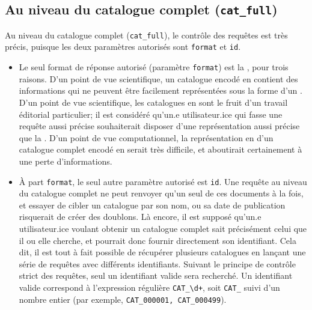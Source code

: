 \subsection{Au niveau du catalogue complet (\texttt{cat\_full})}
Au niveau du catalogue complet (\texttt{cat\_full}), le contrôle des requêtes est très précis, puisque les deux paramètres autorisés sont \texttt{format} et \texttt{id}.
\begin{itemize}
	\item Le seul format de réponse autorisé (paramètre \texttt{format}) est la \tei{}, pour trois raisons. D'un point de vue scientifique, un catalogue encodé en \tei{} contient des informations qui ne peuvent être facilement représentées sous la forme d'un \json{}. D'un point de vue scientifique, les catalogues en \tei{} sont le fruit d'un travail éditorial particulier; il est considéré qu'un.e utilisateur.ice qui fasse une requête aussi précise souhaiterait disposer d'une représentation aussi précise que la \tei{}. D'un point de vue computationnel, la représentation en \json{} d'un catalogue complet encodé en \tei{} serait très difficile, et aboutirait certainement à une perte d'informations.
	\item À part \texttt{format}, le seul autre paramètre autorisé est \texttt{id}. Une requête au niveau du catalogue complet ne peut renvoyer qu'un seul de ces documents à la fois, et essayer de cibler un catalogue par son nom, ou sa date de publication risquerait de créer des doublons. Là encore, il est supposé qu'un.e utilisateur.ice voulant obtenir un catalogue complet sait précisément celui que il ou elle cherche, et pourrait donc fournir directement son identifiant. Cela dit, il est tout à fait possible de récupérer plusieurs catalogues en lançant une série de requêtes avec différents identifiants. Suivant le principe de contrôle strict des requêtes, seul un identifiant valide sera recherché. Un identifiant valide correspond à l'expression régulière \texttt{CAT\_\textbackslash{}d+}, soit \texttt{CAT\_} suivi d'un nombre entier (par exemple, \texttt{CAT\_000001, CAT\_000499}).
\end{itemize}

